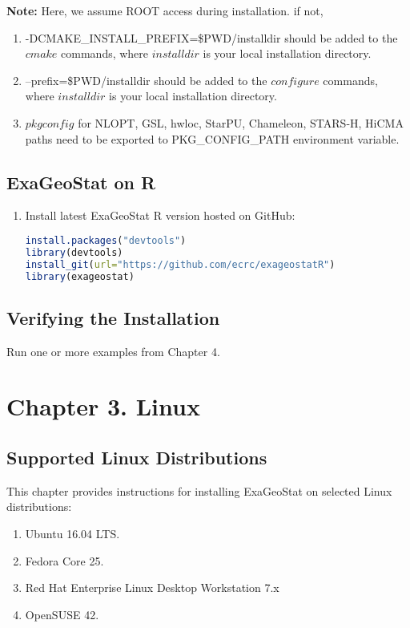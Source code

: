 \documentclass[
10pt, %
a4paper, %
oneside, %
headinclude,footinclude, %
BCOR5mm, %
]{scrartcl}
\begin{document}
\begin{shaded}
{\textbf {Note:}} Here, we assume ROOT access during installation. if not, 
\begin{enumerate}
\item -DCMAKE\_INSTALL\_PREFIX=\$PWD/installdir should be added to the $cmake$ commands, where $installdir$ is your local installation directory.
\item --prefix=\$PWD/installdir should be added to the $configure$ commands, where $installdir$ is your local installation directory.
\item  $pkgconfig$ for NLOPT, GSL, hwloc, StarPU, Chameleon, STARS-H, HiCMA paths need to be exported to PKG\_CONFIG\_PATH environment variable.
\end{enumerate}
\end{shaded}

\subsection{ExaGeoStat on R}
\begin{enumerate}
\item
\noindent Install latest ExaGeoStat R version hosted on GitHub:
\begin{lstlisting}[language=R]
install.packages("devtools")
library(devtools)
install_git(url="https://github.com/ecrc/exageostatR")
library(exageostat)
\end{lstlisting}


\end{enumerate}


\subsection{Verifying the Installation}
Run one or more examples from Chapter 4.


\section{Chapter 3. Linux}
\subsection{Supported Linux Distributions}
This chapter provides instructions for installing ExaGeoStat on selected Linux distributions:
\begin{enumerate}
\item Ubuntu 16.04 LTS.
\item  Fedora Core 25.
\item Red Hat Enterprise Linux Desktop Workstation 7.x
\item  OpenSUSE 42.

\end{enumerate}
\end{document}
